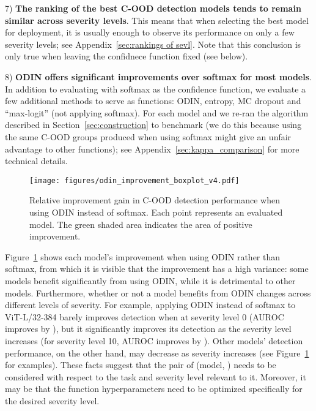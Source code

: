 \documentclass[table]{article} \usepackage{PRIMEarxiv}
\begin{document}
7) \textbf{The ranking of the best C-OOD detection models tends to remain similar across severity levels}. This means that when selecting the best model for deployment, it is usually enough to observe its performance on only a few severity levels; see Appendix~\ref{sec:rankings of sevl}. Note that this conclusion is only true when leaving the  confidnece function fixed (see below).

8) \textbf{ODIN offers significant improvements over softmax for most models}.
In addition to evaluating with softmax as the  confidence function, we evaluate a few additional methods to serve as  functions: ODIN, entropy, MC dropout and ``max-logit'' (not applying softmax).
For each model  and  we re-ran the algorithm described in Section~\ref{sec:construction} to benchmark  (we do this because using the same C-OOD groups produced when using softmax might give an unfair advantage to other  functions); see Appendix~\ref{sec:kappa_comparison} for more technical details.


\begin{figure}[htb]
    \centering
\texttt{[image: figures/odin\_improvement\_boxplot\_v4.pdf]}
    \caption{Relative improvement gain in C-OOD detection performance when using ODIN instead of softmax. Each point represents an evaluated model.
    The green shaded area indicates the area of positive improvement.}
    \label{fig:odin_boxplots}
\end{figure}
Figure~\ref{fig:odin_boxplots} shows each model's improvement when using ODIN rather than softmax, 
from which it is visible that the improvement has a high variance: some models benefit significantly from using ODIN, while it is detrimental to other models. Furthermore, whether or not a model benefits from ODIN changes across different levels of severity. For example, applying ODIN instead of softmax to \textcolor{myteal}{ViT-L/32-384} barely improves detection when at severity level 0 (AUROC improves by ), but it significantly improves its detection as the severity level increases (for severity level 10, AUROC improves by ).
Other models' detection performance, on the other hand, may decrease as severity increases (see Figure~\ref{fig:odin_boxplots} for examples). 
These facts suggest that the pair of (model, ) needs to be considered with respect to the task and severity level relevant to it. Moreover, it may be that the  function hyperparameters need to be optimized specifically for the desired severity level.
\end{document}
